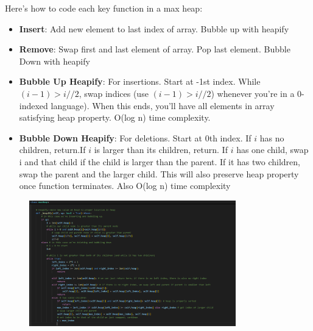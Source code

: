 \documentclass[12pt]{article}
\begin{document}
Here's how to code each key function in a max heap:
\begin{itemize}
\item \textbf{Insert}: Add new element to last index of array. Bubble up with heapify
\item \textbf{Remove}: Swap first and last element of array. Pop last element. Bubble Down with heapify
\item \textbf{Bubble Up Heapify}: For insertions. Start at -1st index. While \((i-1)>i//2\), swap indices (use \((i-1)>i//2\)) whenever you're in a 0-indexed language). When this ends,  you'll have all elements in array satisfying heap property. O(log n) time complexity.
\item \textbf{Bubble Down Heapify}: For deletions. Start at 0th index. If \(i\) has no children, return.If \(i\) is larger than its children, return. If \(i\) has one child, swap i and that child if the child is larger than the parent. If it has two children, swap the parent and the larger child. This will also preserve heap property once function terminates. Also O(log n) time complexity
\end{itemize}
\begin{figure}[H]
    \centering
    \includegraphics[width=0.8\textwidth]{./heapify.png} %
\end{figure}
\end{document}
